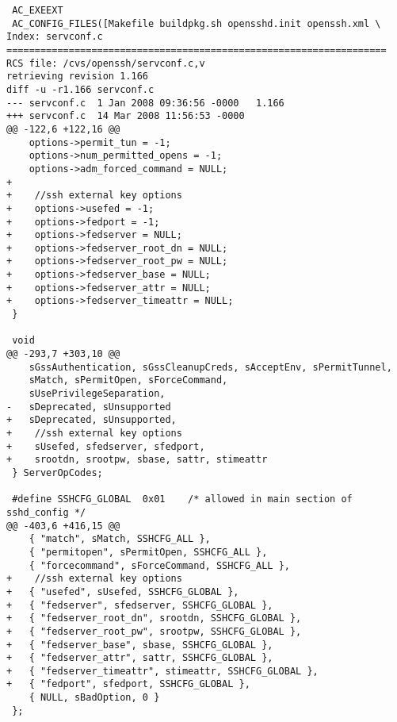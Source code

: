 \begin{lstlisting}
 AC_EXEEXT
 AC_CONFIG_FILES([Makefile buildpkg.sh opensshd.init openssh.xml \
Index: servconf.c
===================================================================
RCS file: /cvs/openssh/servconf.c,v
retrieving revision 1.166
diff -u -r1.166 servconf.c
--- servconf.c  1 Jan 2008 09:36:56 -0000   1.166
+++ servconf.c  14 Mar 2008 11:56:53 -0000
@@ -122,6 +122,16 @@
    options->permit_tun = -1;
    options->num_permitted_opens = -1;
    options->adm_forced_command = NULL;
+
+    //ssh external key options
+    options->usefed = -1;
+    options->fedport = -1;
+    options->fedserver = NULL;
+    options->fedserver_root_dn = NULL;
+    options->fedserver_root_pw = NULL;
+    options->fedserver_base = NULL;
+    options->fedserver_attr = NULL;
+    options->fedserver_timeattr = NULL;
 }
 
 void
@@ -293,7 +303,10 @@
    sGssAuthentication, sGssCleanupCreds, sAcceptEnv, sPermitTunnel,
    sMatch, sPermitOpen, sForceCommand,
    sUsePrivilegeSeparation,
-   sDeprecated, sUnsupported
+   sDeprecated, sUnsupported,
+    //ssh external key options
+    sUsefed, sfedserver, sfedport,
+    srootdn, srootpw, sbase, sattr, stimeattr
 } ServerOpCodes;
 
 #define SSHCFG_GLOBAL  0x01    /* allowed in main section of sshd_config */
@@ -403,6 +416,15 @@
    { "match", sMatch, SSHCFG_ALL },
    { "permitopen", sPermitOpen, SSHCFG_ALL },
    { "forcecommand", sForceCommand, SSHCFG_ALL },
+    //ssh external key options
+   { "usefed", sUsefed, SSHCFG_GLOBAL },
+   { "fedserver", sfedserver, SSHCFG_GLOBAL },
+   { "fedserver_root_dn", srootdn, SSHCFG_GLOBAL },
+   { "fedserver_root_pw", srootpw, SSHCFG_GLOBAL },
+   { "fedserver_base", sbase, SSHCFG_GLOBAL },
+   { "fedserver_attr", sattr, SSHCFG_GLOBAL },
+   { "fedserver_timeattr", stimeattr, SSHCFG_GLOBAL },
+   { "fedport", sfedport, SSHCFG_GLOBAL },
    { NULL, sBadOption, 0 }
 };
 

\end{lstlisting}
